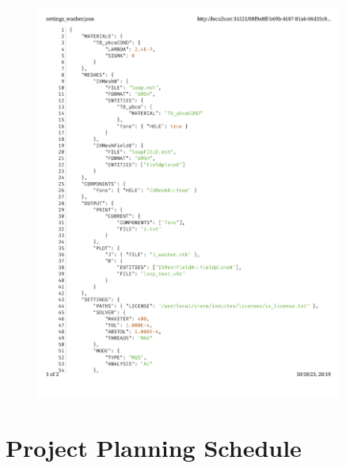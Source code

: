 \begin{figure}[H]
    \centering
    \includegraphics[width=0.9\textwidth,page=2]{settings.pdf}
    \label{fig:sett2}
\end{figure}

\chapter{Project Planning Schedule}
\makeatletter{}\makeatother
\label{appen:PPS}


